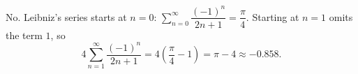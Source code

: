 No. Leibniz's series starts at $n=0$: $\displaystyle\sum_{n=0}^\infty\dfrac{(-1)^n}{2n+1}=\dfrac\pi4$. Starting at $n=1$ omits the term $1$, so
\[4\sum_{n=1}^{\infty}\dfrac{(-1)^n}{2n+1}=4\left(\dfrac\pi4-1\right)=\boxed{\pi-4}\approx-0.858.\]
